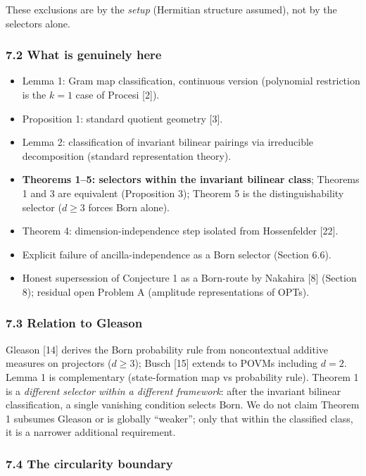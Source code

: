 \documentclass[
]{article}
\providecommand{\tightlist}{%
  \setlength{\itemsep}{0pt}\setlength{\parskip}{0pt}}
\begin{document}
These exclusions are by the \emph{setup} (Hermitian structure assumed),
not by the selectors alone.

\subsubsection{7.2 What is genuinely here}\label{what-is-genuinely-here}

\begin{itemize}
\tightlist
\item
  Lemma 1: Gram map classification, continuous version (polynomial
  restriction is the \(k=1\) case of Procesi {[}2{]}).
\item
  Proposition 1: standard quotient geometry {[}3{]}.
\item
  Lemma 2: classification of invariant bilinear pairings via irreducible
  decomposition (standard representation theory).
\item
  \textbf{Theorems 1--5: selectors within the invariant bilinear class};
  Theorems 1 and 3 are equivalent (Proposition 3); Theorem 5 is the
  distinguishability selector (\(d\geq 3\) forces Born alone).
\item
  Theorem 4: dimension-independence step isolated from Hossenfelder
  {[}22{]}.
\item
  Explicit failure of ancilla-independence as a Born selector (Section
  6.6).
\item
  Honest supersession of Conjecture 1 as a Born-route by Nakahira
  {[}8{]} (Section 8); residual open Problem A (amplitude
  representations of OPTs).
\end{itemize}

\subsubsection{7.3 Relation to Gleason}\label{relation-to-gleason}

Gleason {[}14{]} derives the Born probability rule from noncontextual
additive measures on projectors (\(d\geq 3\)); Busch {[}15{]} extends to
POVMs including \(d=2\). Lemma 1 is complementary (state-formation map
vs probability rule). Theorem 1 is a \emph{different selector within a
different framework}: after the invariant bilinear classification, a
single vanishing condition selects Born. We do not claim Theorem 1
subsumes Gleason or is globally ``weaker''; only that within the
classified class, it is a narrower additional requirement.

\subsubsection{7.4 The circularity
boundary}\label{the-circularity-boundary}
\end{document}

